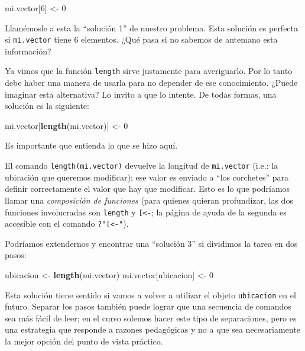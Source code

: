 \documentclass[]{article}
\newenvironment{Shaded}{}{}
\newcommand{\KeywordTok}[1]{\textcolor[rgb]{0.00,0.44,0.13}{\textbf{{#1}}}}
\newcommand{\DecValTok}[1]{\textcolor[rgb]{0.25,0.63,0.44}{{#1}}}
\newcommand{\NormalTok}[1]{{#1}}
\begin{document}
\begin{Shaded}
\begin{Highlighting}[]
\NormalTok{mi.vector[}\DecValTok{6}\NormalTok{] <- }\DecValTok{0}
\end{Highlighting}
\end{Shaded}
Llamémosle a esta la ``solución 1'' de nuestro problema. Esta solución
es perfecta si \texttt{mi.vector} tiene 6 elementos. ¿Qué pasa si no
sabemos de antemano esta información?

Ya vimos que la función \texttt{length} sirve justamente para
averiguarlo. Por lo tanto debe haber una manera de usarla para no
depender de ese conocimiento. ¿Puede imaginar esta alternativa? Lo
invito a que lo intente. De todas formas, una solución es la siguiente:

\begin{Shaded}
\begin{Highlighting}[]
\NormalTok{mi.vector[}\KeywordTok{length}\NormalTok{(mi.vector)] <- }\DecValTok{0}
\end{Highlighting}
\end{Shaded}
Es importante que entienda lo que se hizo aquí.

El comando \texttt{length(mi.vector)} devuelve la longitud de
\texttt{mi.vector} (i.e.: la ubicación que queremos modificar); ese
valor es enviado a ``los corchetes'' para definir correctamente el valor
que hay que modificar. Esto es lo que podríamos llamar una
\emph{composición de funciones} (para quienes quieran profundizar, las
dos funciones involucradas son \texttt{length} y
\texttt{{[}\textless{}-}; la página de ayuda de la segunda es accesible
con el comando \texttt{?"{[}\textless{}-"}).

Podríamos extendernos y encontrar una ``solución 3'' si dividimos la
tarea en dos pasos:

\begin{Shaded}
\begin{Highlighting}[]
\NormalTok{ubicacion <- }\KeywordTok{length}\NormalTok{(mi.vector)}
\NormalTok{mi.vector[ubicacion] <- }\DecValTok{0}
\end{Highlighting}
\end{Shaded}
Esta solución tiene sentido si vamos a volver a utilizar el objeto
\texttt{ubicacion} en el futuro. Separar los pasos también puede lograr
que una secuencia de comandos sea más fácil de leer; en el curso solemos
hacer este tipo de separaciones, pero es una estrategia que responde a
razones pedagógicas y no a que sea necesariamente la mejor opción del
punto de vista práctico.
\end{document}
